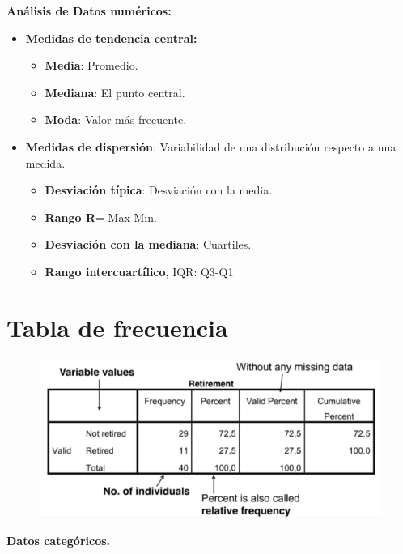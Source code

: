 \documentclass[12pt, twoside, openright]{report} %
\begin{document}
\textbf{Análisis de Datos numéricos:}

\begin{itemize}
	\item \textbf{Medidas de tendencia central:}

	      \begin{itemize}
		      \item \textbf{Media}: Promedio.
		      \item \textbf{Mediana}: El punto central.
		      \item \textbf{Moda}: Valor más frecuente.
	      \end{itemize}
	\item \textbf{Medidas de dispersión}: Variabilidad de una distribución
	      respecto a una medida.

	      \begin{itemize}
		      \item \textbf{Desviación típica}: Desviación con la media.
		      \item \textbf{Rango R}= Max-Min.
		      \item \textbf{Desviación con la mediana}: Cuartiles.
		      \item \textbf{Rango intercuartílico}, IQR: Q3-Q1
	      \end{itemize}
\end{itemize}

\section{Tabla de frecuencia}

\begin{figure}[H]
	{\includegraphics[scale=.5]{Untitled 3.png}}
\end{figure}

\textbf{Datos categóricos.}
\end{document}
